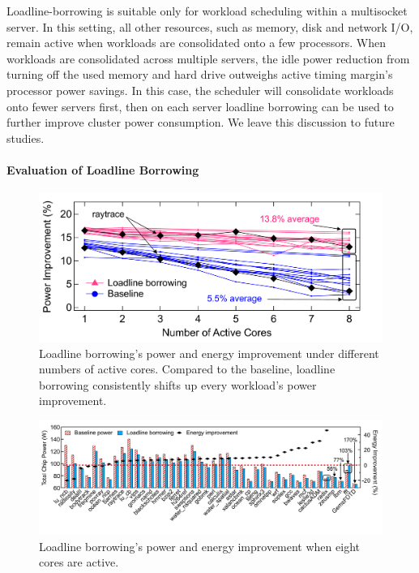 Loadline-borrowing is suitable only for workload scheduling within a multisocket server. In this setting, all other resources, such as memory, disk and network I/O, remain active when workloads are consolidated onto a few processors. When workloads are consolidated across multiple servers, the idle power reduction from turning off the used memory and hard drive outweighs active timing margin's processor power savings. In this case, the scheduler will consolidate workloads onto fewer servers first, then on each server loadline borrowing can be used to further improve cluster power consumption. We leave this discussion to future studies.

\paragraph{Evaluation of Loadline Borrowing}
\begin{figure}[t]
\centering
    \includegraphics[trim=0 0 0 0, clip,width=0.8\linewidth]{graphs/loadline-borrowing_scale.pdf}
    \caption{Loadline borrowing's power and energy improvement under different numbers of active cores. Compared to the baseline, loadline borrowing consistently shifts up every workload's power improvement.}
    \label{fig:ll-borrow-scale}
    \vspace{-0.2cm}
\end{figure}

\begin{figure}[t]
\centering
    \vspace{0.4in}
    \includegraphics[trim=0 0 0 0,clip,width=\linewidth]{graphs/split_benefits_all.pdf}
    \caption{Loadline borrowing's power and energy improvement when eight cores are active.}
    \label{fig:ll-borrow-8core-normal}
\end{figure}

